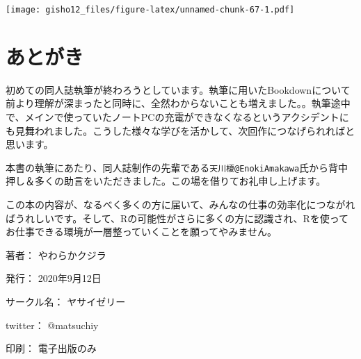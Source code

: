 \documentclass[
  xelatex,ja=standard, b5paper]{bxjsbook}
\begin{document}
\texttt{[image: gisho12\_files/figure-latex/unnamed-chunk-67-1.pdf]}

\hypertarget{ux3042ux3068ux304cux304d}{%
\chapter*{あとがき}\label{ux3042ux3068ux304cux304d}}

初めての同人誌執筆が終わろうとしています。執筆に用いたBookdownについて前より理解が深まったと同時に、全然わからないことも増えました。。執筆途中で、メインで使っていたノートPCの充電ができなくなるというアクシデントにも見舞われました。こうした様々な学びを活かして、次回作につなげられればと思います。

本書の執筆にあたり、同人誌制作の先輩である\texttt{天川榎@EnokiAmakawa}氏から背中押し＆多くの助言をいただきました。この場を借りてお礼申し上げます。

この本の内容が、なるべく多くの方に届いて、みんなの仕事の効率化につながればうれしいです。そして、Rの可能性がさらに多くの方に認識され、Rを使ってお仕事できる環境が一層整っていくことを願ってやみません。

\clearpage
{}
\begin{flushright}
\begin{minipage}{0.5\hsize}
\begin{description}
  \item{著者：} やわらかクジラ
  \item{発行：} 2020年9月12日
  \item{サークル名：} ヤサイゼリー
  \item{twitter：} @matsuchiy
  \item{印刷：} 電子出版のみ
\end{description}
\end{minipage}
\end{flushright}
\clearpage
\end{document}
